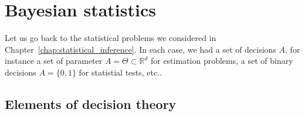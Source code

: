 \documentclass[
	fontsize=11pt, %
	twoside=false, %
	numbers=noenddot, %
]{kaobook}
\newcommand{\R}{\mathbb R}
\begin{document}









\mainmatter %


% 

% 

% 

% 


\setchapterpreamble[u]{\margintoc}
\chapter{Bayesian statistics}
\label{chap:bayesian_statistics}

Let us go back to the statistical problems we considered in Chapter~\ref{chap:statistical_inference}.
In each case, we had a set of decisions $A$, for instance a set of parameter $A = \Theta \subset \R^d$ for estimation problems, a set of binary decisions $A = \{ 0, 1 \}$ for statistial tests, etc..

\section{Elements of decision theory} %
\label{sec:elements_of_decision_theory}
\end{document}
